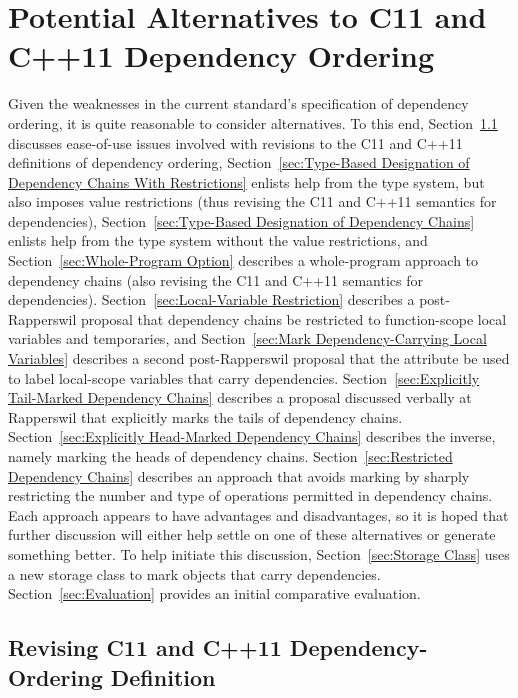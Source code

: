 \documentclass[letterpaper,twocolumn,10pt]{article}
\begin{document}
\section{Potential Alternatives to C11 and C++11 Dependency Ordering}
\label{sec:Potential Alternatives to C11 and C++11 Dependency Ordering}

Given the weaknesses in the current standard's specification of
dependency ordering, it is quite reasonable to consider alternatives.
To this end,
Section~\ref{sec:Revising C11 and C++11 Dependency-Ordering Definition}
discusses ease-of-use issues involved with revisions to the
C11 and C++11 definitions of dependency ordering,
Section~\ref{sec:Type-Based Designation of Dependency Chains With Restrictions}
enlists help from the type system, but also imposes value restrictions
(thus revising the C11 and C++11 semantics for dependencies),
Section~\ref{sec:Type-Based Designation of Dependency Chains}
enlists help from the type system without the value restrictions,
and
Section~\ref{sec:Whole-Program Option} describes a whole-program approach
to dependency chains (also revising the C11 and C++11 semantics for
dependencies).
Section~\ref{sec:Local-Variable Restriction}
describes a post-Rapperswil proposal that dependency chains be
restricted to function-scope local variables and temporaries, and
Section~\ref{sec:Mark Dependency-Carrying Local Variables}
describes a second post-Rapperswil proposal that the
 attribute be used to label local-scope
variables that carry dependencies.
Section~\ref{sec:Explicitly Tail-Marked Dependency Chains}
describes a proposal discussed verbally at Rapperswil that explicitly
marks the tails of dependency chains.
Section~\ref{sec:Explicitly Head-Marked Dependency Chains}
describes the inverse, namely marking the heads of dependency chains.
Section~\ref{sec:Restricted Dependency Chains}
describes an approach that avoids marking by sharply restricting the
number and type of operations permitted in dependency chains.
Each approach appears to have advantages and disadvantages,
so it is hoped that further discussion will either help settle on
one of these alternatives or generate something better.
To help initiate this discussion,
Section~\ref{sec:Storage Class} uses a new 
storage class to mark objects that carry dependencies.
Section~\ref{sec:Evaluation}
provides an initial comparative evaluation.

\subsection{Revising C11 and C++11 Dependency-Ordering Definition}
\label{sec:Revising C11 and C++11 Dependency-Ordering Definition}
\end{document}
